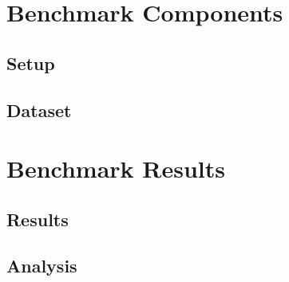 
\section{Benchmark Components}
\label{sec:benchcomp}
\subsection{Setup}
\subsection{Dataset}
\section{Benchmark Results}
\label{sec:benchresult}
\subsection{Results}
\subsection{Analysis}
